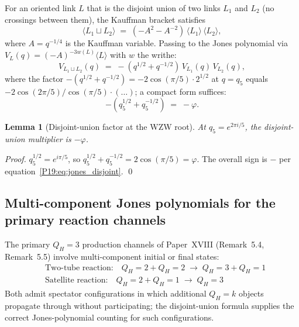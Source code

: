 \documentclass[11pt,a4paper]{article}
\newtheorem{lemma}[theorem]{Lemma}
\theoremstyle{definition}\newtheorem{definition}[theorem]{Definition}
\theoremstyle{remark}
\newcommand{\vp}{\varphi}
\newcommand{\QH}{Q_H}
\newcommand{\Jones}{V}
\begin{document}
For an oriented link $L$ that is the disjoint union of two links
$L_1$ and $L_2$ (no crossings between them), the Kauffman bracket
satisfies
\begin{equation}
  \langle L_1 \sqcup L_2 \rangle
  \;=\; (-A^2-A^{-2})\,\langle L_1\rangle\,\langle L_2\rangle,
  \label{P19:eq:kauffman_disjoint}
\end{equation}
where $A=q^{-1/4}$ is the Kauffman variable.  Passing to the Jones
polynomial via $\Jones_L(q)=(-A)^{-3w(L)}\langle L\rangle$ with $w$
the writhe:
\begin{equation}
  \Jones_{L_1\sqcup L_2}(q)
  \;=\; -(q^{1/2}+q^{-1/2})\,\Jones_{L_1}(q)\,\Jones_{L_2}(q),
  \label{P19:eq:jones_disjoint}
\end{equation}
where the factor $-(q^{1/2}+q^{-1/2})=-2\cos(\pi/5)\cdot 2^{1/2}$
at $q=q_5$ equals $-2\cos(2\pi/5)/\cos(\pi/5)\cdot(\ldots)$; a
compact form suffices:
\begin{equation}
  -(q_5^{1/2}+q_5^{-1/2}) \;=\; -\vp.
  \label{P19:eq:disjoint_factor_at_q5}
\end{equation}

\begin{lemma}[Disjoint-union factor at the WZW root]
\label{P19:lem:disjoint_factor}
At $q_5=e^{2\pi i/5}$, the disjoint-union multiplier is $-\vp$.
\end{lemma}

\begin{proof}
$q_5^{1/2}=e^{i\pi/5}$, so
$q_5^{1/2}+q_5^{-1/2}=2\cos(\pi/5)=\vp$.  The overall sign is
$-$ per equation~\eqref{P19:eq:jones_disjoint}.
\qed
\end{proof}

\subsection{Multi-component Jones polynomials for the primary reaction channels}

The primary $\QH=3$ production channels of Paper~XVIII
(Remark~5.4, Remark~5.5) involve multi-component initial or final %
states:
\begin{align}
  &\text{Two-tube reaction:}
  \quad \QH=2+\QH=2 \;\to\; \QH=3 + \QH=1
  \tag{Ch.~1}\\
  &\text{Satellite reaction:}
  \quad \QH=2+\QH=1 \;\to\; \QH=3
  \tag{Ch.~2}
\end{align}
Both admit spectator configurations in which additional
$\QH=k$ objects propagate through without participating; the
disjoint-union formula supplies the correct Jones-polynomial
counting for such configurations.
\end{document}
